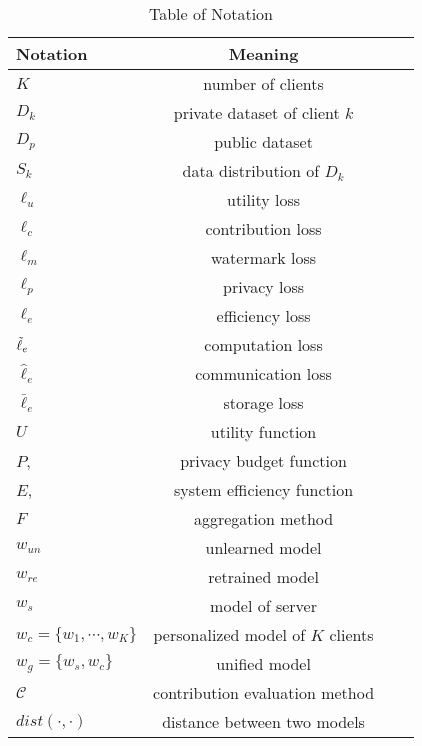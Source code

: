 \begin{table}[htbp]
\normalsize
\caption{Table of Notation}
    \begin{center}
        \begin{tabular}{lccc}
            \hline
            Notation & Meaning \\ 
            \hline 
            $K$ & number of clients \\
            $D_k$ & private dataset of client $k$ \\
                        $D_p$ & public dataset \\
            $S_k$ & data distribution of $D_k$ \\
            $\ell_u$  & utility loss \\
            $\ell_c$  & contribution loss \\ 
            $\ell_{m}$  & watermark loss \\
            $\ell_p$ &privacy loss\\
            $\ell_e$ & efficiency loss\\
                        $\Tilde \ell_e$ & computation loss \\
                        $\hat \ell_e$ & communication loss \\
                        $\bar \ell_e$ & storage loss \\
        
             $U$  & utility function \\
            $P$, &privacy budget function\\
                        $E$, &system efficiency function\\
            $F$ & aggregation method \\
            $w_{un}$ & unlearned model \\
            $w_{re}$ & retrained model \\
            $w_s$ & model of server  \\
            $w_c = \{w_1, \cdots, w_K\}$ &personalized model of $K$ clients  \\
            $w_g=\{w_s,w_c\}$ & unified model  \\
            
        $\mathcal C$ & contribution evaluation method \\
            $dist(\cdot, \cdot)$ & distance between two models \\       
            \hline
        \end{tabular}
    \label{tab:notation}
    \end{center}
\end{table}
